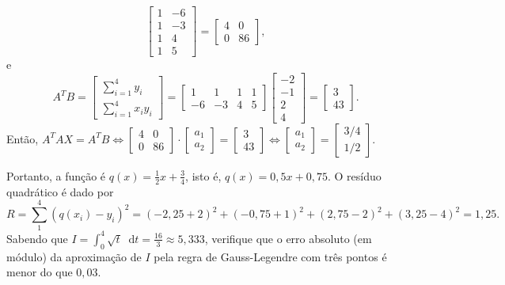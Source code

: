 \documentclass[12pt,a4paper]{article}
\newcommand*\diff{\mathop{}\!\mathrm{d}}
\begin{document}
\begin{ExerciseList}
\[\begin{bmatrix}
  1 & -6\\
  1 & -3\\
  1 & 4\\
  1 & 5
\end{bmatrix}
=\begin{bmatrix}
4 & 0 \\
0 & 86
\end{bmatrix},
\]
e
\[
A^T B
= \begin{bmatrix}
 \sum_{i=1}^4 y_i     \\
 \sum_{i=1}^4 x_i y_i
\end{bmatrix}
= \begin{bmatrix}
 1 & 1 & 1 & 1 \\
-6 & -3 & 4 & 5
\end{bmatrix}
\begin{bmatrix}
-2 \\ -1 \\ 2 \\ 4
\end{bmatrix}
= \begin{bmatrix}
3 \\ 43
\end{bmatrix}.
\]
Então,
$
A^T A X = A^T B
\Leftrightarrow
\begin{bmatrix}
4 & 0 \\
0 & 86
\end{bmatrix}
\cdot
\begin{bmatrix}
a_1\\
a_2
\end{bmatrix}
=
\begin{bmatrix}
3 \\ 43
\end{bmatrix}
\Leftrightarrow
\begin{bmatrix}
a_1\\
a_2
\end{bmatrix}
=
\begin{bmatrix}
3/4\\
1/2
\end{bmatrix}.
$

Portanto, a função é $q(x) = \frac{1}{2}x + \frac{3}{4}$, isto é, $q(x) = 0,5x + 0,75$. O resíduo quadrático é dado por
\[
R = \sum_1^4 (q(x_i) - y_i)^2
  = (-2,25 + 2)^2 + (-0,75 + 1)^2 + (2,75 - 2)^2 + (3,25 - 4)^2 = 1,25.
\]
\Exercise[title={2,0}] Sabendo que
$I = \int_{0}^{4} \sqrt{t} \diff{t}
= \frac{16}{3}
\approx 5,333$,
verifique que o erro absoluto (em módulo) da aproximação de $I$ pela regra de Gauss-Legendre com três pontos é menor do que $0,03$.


\end{ExerciseList}
\end{document}
